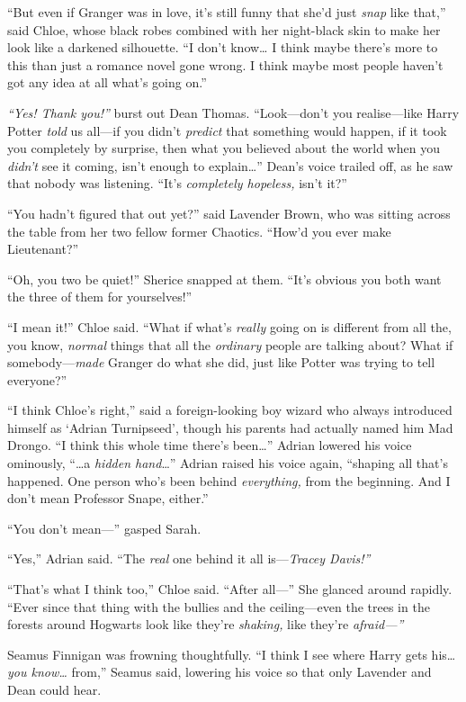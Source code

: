 ``But even if Granger was in love, it's still funny that she'd just
\emph{snap} like that,'' said Chloe, whose black robes combined with her
night-black skin to make her look like a darkened silhouette. ``I don't
know\ldots{} I think maybe there's more to this than just a romance
novel gone wrong. I think maybe most people haven't got any idea at all
what's going on.''

\emph{``Yes! Thank you!''} burst out Dean Thomas. ``Look---don't you
realise---like Harry Potter \emph{told} us all---if you didn't
\emph{predict} that something would happen, if it took you completely by
surprise, then what you believed about the world when you \emph{didn't}
see it coming, isn't enough to explain\ldots{}'' Dean's voice trailed
off, as he saw that nobody was listening. ``It's \emph{completely
hopeless,} isn't it?''

``You hadn't figured that out yet?'' said Lavender Brown, who was
sitting across the table from her two fellow former Chaotics. ``How'd
you ever make Lieutenant?''

``Oh, you two be quiet!'' Sherice snapped at them. ``It's obvious you
both want the three of them for yourselves!''

``I mean it!'' Chloe said. ``What if what's \emph{really} going on is
different from all the, you know, \emph{normal} things that all the
\emph{ordinary} people are talking about? What if somebody---\emph{made}
Granger do what she did, just like Potter was trying to tell everyone?''

``I think Chloe's right,'' said a foreign-looking boy wizard who always
introduced himself as `Adrian Turnipseed', though his parents had
actually named him Mad Drongo. ``I think this whole time there's
been\ldots{}'' Adrian lowered his voice ominously, ``\ldots{}a
\emph{hidden hand}\ldots{}'' Adrian raised his voice again, ``shaping
all that's happened. One person who's been behind \emph{everything,}
from the beginning. And I don't mean Professor Snape, either.''

``You don't mean---'' gasped Sarah.

``Yes,'' Adrian said. ``The \emph{real} one behind it all
is---\emph{Tracey Davis!''}

``That's what I think too,'' Chloe said. ``After all---'' She glanced
around rapidly. ``Ever since that thing with the bullies and the
ceiling---even the trees in the forests around Hogwarts look like
they're \emph{shaking,} like they're \emph{afraid---''}

Seamus Finnigan was frowning thoughtfully. ``I think I see where Harry
gets his\ldots{} \emph{you know\ldots{}} from,'' Seamus said, lowering
his voice so that only Lavender and Dean could hear.


